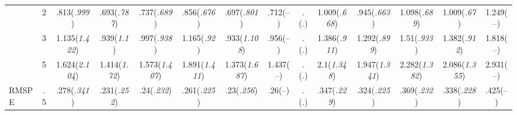 \documentclass{article}
\begin{document}
\begin{table}[tbp]
{\begin{tabularx}{\textwidth}{lCCCCCCCCCCCCC}
&2&.813\newline (\emph{.999})&.693\newline (\emph{.787})&.737\newline (\emph{.689})&.856\newline (\emph{.676})&.697\newline (\emph{.801})&.712\newline (--)&.\newline (\emph{.})&1.009\newline (\emph{.668})&.945\newline (\emph{.663})&1.098\newline (\emph{.689})&1.009\newline (\emph{.67})&1.249\newline (--) \tabularnewline
&3&1.135\newline (\emph{1.422})&.939\newline (\emph{1.1})&.997\newline (\emph{.938})&1.165\newline (\emph{.92})&.933\newline (\emph{1.108})&.956\newline (--)&.\newline (\emph{.})&1.386\newline (\emph{.911})&1.292\newline (\emph{.899})&1.51\newline (\emph{.933})&1.382\newline (\emph{.912})&1.818\newline (--) \tabularnewline
&5&1.624\newline (\emph{2.104})&1.414\newline (\emph{1.72})&1.573\newline (\emph{1.407})&1.891\newline (\emph{1.411})&1.373\newline (\emph{1.687})&1.437\newline (--)&.\newline (\emph{.})&2.1\newline (\emph{1.348})&1.947\newline (\emph{1.341})&2.282\newline (\emph{1.382})&2.086\newline (\emph{1.355})&2.931\newline (--) \tabularnewline
\midrule RMSPE&.5&.278\newline (\emph{.341})&.231\newline (\emph{.252})&.24\newline (\emph{.232})&.261\newline (\emph{.225})&.23\newline (\emph{.256})&.26\newline (--)&.\newline (\emph{.})&.347\newline (\emph{.229})&.324\newline (\emph{.225})&.369\newline (\emph{.232})&.338\newline (\emph{.228})&.425\newline (--) \tabularnewline

\end{tabularx}}
\end{table}
\end{document}
